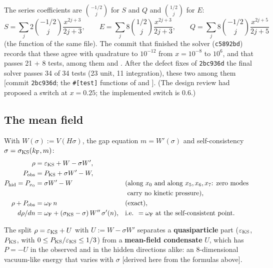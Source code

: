 The series coefficients are $\binom{-1/2}{j}$ for $S$ and $Q$ and $\binom{1/2}{j}$ for $E$:
\[
  S=\sum_j 2\binom{-1/2}{j}\frac{x^{2j+3}}{2j+3},\qquad
  E=\sum_j 8\binom{1/2}{j}\frac{x^{2j+3}}{2j+3},\qquad
  Q=\sum_j 8\binom{-1/2}{j}\frac{x^{2j+5}}{2j+5}
\]
(the  function of the same file). The commit that finished the solver
(\texttt{c5892bd}) records that these agree with quadrature to $10^{-12}$ from $x=10^{-8}$ to $10^{6}$,
and that  passes 21 + 8 tests, among them
 and
. After the defect
fixes of \texttt{2bc936d} the final solver passes 34 of 34 tests (23 unit, 11 integration), these two
among them [commit \texttt{2bc936d}; the \texttt{\#[test]} functions of  and
]. (The design
review had proposed a switch at $x=0.25$; the implemented switch is $0.6$.)

\subsection{The mean field}
\label{sec:8.6}

With $W(\sigma):=V(H\sigma)$, the gap equation $m=W'(\sigma)$ and self-consistency
$\sigma=\sigma_{\mathrm{KS}}(k_{\mathrm{F}},m)$:
\begin{align*}
  \rho&=\varepsilon_{\mathrm{KS}}+W-\sigma W',\\
  P_{\mathrm{obs}}&=P_{\mathrm{KS}}+\sigma W'-W,\\
  P_{\mathrm{hid}}=P_{x_0}&=\sigma W'-W &&\text{(along } x_0 \text{ and along } x_5,x_6,x_7\text{: zero modes}\\
  & &&\ \text{carry no kinetic pressure)},\\
  \rho+P_{\mathrm{obs}}&=\omega_{\mathrm{F}}\,n &&\text{(exact)},\\
  d\rho/dn&=\omega_{\mathrm{F}}+(\sigma_{\mathrm{KS}}-\sigma)\,W''\,\sigma'(n), &&\text{i.e. } =\omega_{\mathrm{F}} \text{ at the self-consistent point}.
\end{align*}
 

The split $\rho=\varepsilon_{\mathrm{KS}}+U$ with $U:=W-\sigma W'$ separates a \textbf{quasiparticle} part ($\varepsilon_{\mathrm{KS}}$,
$P_{\mathrm{KS}}$, with $0\leq P_{\mathrm{KS}}/\varepsilon_{\mathrm{KS}}\leq1/3$) from a \textbf{mean-field condensate} $U$, which has $P=-U$ in
the observed and in the hidden directions alike: an 8-dimensional vacuum-like energy that varies with
$\sigma$ [derived here from the formulas above].

